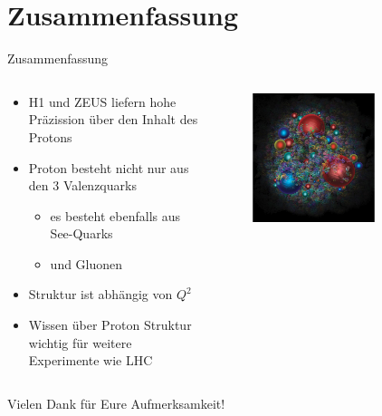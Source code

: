 \documentclass[aspectratio=1610, 9pt]{beamer}
\begin{document}
\section{Zusammenfassung}
\begin{frame}{Zusammenfassung}
  \begin{columns}
    \begin{column}{0.4\textwidth}
      \begin{itemize}
        \item{H1 und ZEUS liefern hohe Präzission über den Inhalt des Protons}
        \item{Proton besteht nicht nur aus den 3 Valenzquarks}
        \begin{itemize}
          \item{es besteht ebenfalls aus See-Quarks}
          \item{und Gluonen}
        \end{itemize}
        \item{Struktur ist abhängig von $Q^2$}
        \item{Wissen über Proton Struktur wichtig für weitere Experimente wie LHC}
      \end{itemize}
    \end{column}

    \begin{column}{0.6\textwidth}
      \begin{figure}
        \centering
        \includegraphics[width=0.7\textwidth]{images/proton-courier.png}
      \end{figure}
    \end{column}
  \end{columns}
\end{frame}

\begin{frame}
\centering
\Huge{Vielen Dank für Eure Aufmerksamkeit!}
\end{frame}
\end{document}
